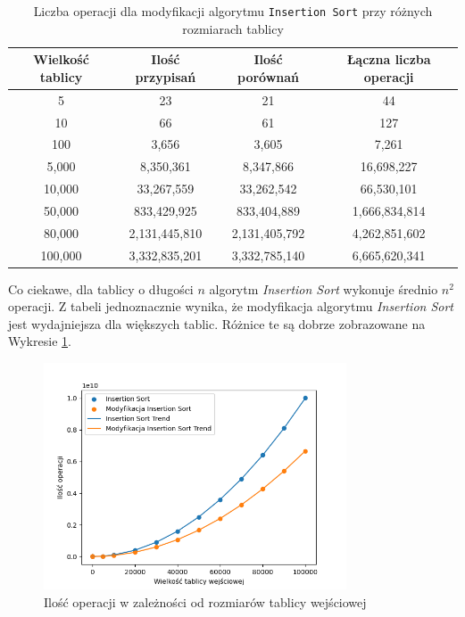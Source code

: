 \documentclass{article}
\begin{document}
\begin{table}[H]
    \centering
    \begin{tabular}{|c|c|c|c|}
    \hline
    \textbf{Wielkość tablicy} & \textbf{Ilość przypisań} & \textbf{Ilość porównań} & \textbf{Łączna liczba operacji} \\ \hline
    5 & 23 & 21 & 44 \\ \hline
    10 & 66 & 61 & 127 \\ \hline
    100 & 3,656 & 3,605 & 7,261 \\ \hline
    5,000 & 8,350,361 & 8,347,866 & 16,698,227 \\ \hline
    10,000 & 33,267,559 & 33,262,542 & 66,530,101 \\ \hline
    50,000 & 833,429,925 & 833,404,889 & 1,666,834,814 \\ \hline
    80,000 & 2,131,445,810 & 2,131,405,792 & 4,262,851,602 \\ \hline
    100,000 & 3,332,835,201 & 3,332,785,140 & 6,665,620,341 \\ \hline
    \end{tabular}
    \caption{Liczba operacji dla modyfikacji algorytmu \texttt{Insertion Sort} przy różnych rozmiarach tablicy}
    \label{tab:m_insertion_results}
\end{table}
Co ciekawe, dla tablicy o długości $n$ algorytm \textit{Insertion Sort} wykonuje średnio $n^2$ operacji. Z tabeli jednoznacznie wynika, że modyfikacja algorytmu \textit{Insertion Sort} jest wydajniejsza dla większych tablic. Różnice te są dobrze zobrazowane na Wykresie \ref{fig:insertion}.
\begin{figure}[H]
    \centering
    \includegraphics[width=0.8\textwidth]{Figure_1.png}
    \caption{Ilość operacji w zależności od rozmiarów tablicy wejściowej}
    \label{fig:insertion}
\end{figure}
\end{document}
